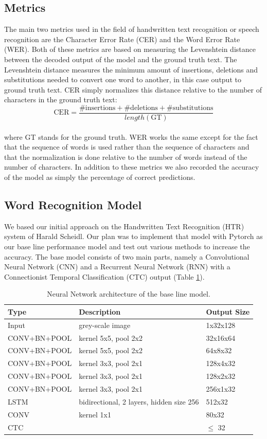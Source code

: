 \documentclass{article}
\begin{document}
\subsection{Metrics}
The main two metrics used in the field of handwritten text recognition or speech recognition are the Character Error Rate (CER) and the Word Error Rate (WER). Both of these metrics are based on measuring the Levenshtein distance between the decoded output of the model and the ground truth text. The Levenshtein distance measures the minimum amount of insertions, deletions and substitutions needed to convert one word to another, in this case output to ground truth text. CER simply normalizes this distance relative to the number of characters in the ground truth text:\\
\[
\text{CER} = \frac{\text{\#insertions}+\text{\#deletions}+\text{\#substitutions}}{length(\text{GT})}
\]\\ 
where GT stands for the ground truth. WER works the same except for the fact that the sequence of words is used rather than the sequence of characters and that the normalization is done relative to the number of words instead of the number of characters. In addition to these metrics we also recorded the accuracy of the model as simply the percentage of correct predictions.
\subsection{Word Recognition Model}
We based our initial approach on the Handwritten Text Recognition (HTR) system of Harald Scheidl\cite{ScheidlHTR}\cite{ScheidlCTC}. Our plan was to implement that model with Pytorch as our base line performance model and test out various methods to increase the accuracy. The base model consists of two main parts, namely a Convolutional Neural Network (CNN) and a Recurrent Neural Network (RNN) with a Connectionist Temporal Classification (CTC) output (Table \ref{tab:SmallModel}).
\begin{table}[H]
\centering
\begin{tabular}{l|l|l}
Type & Description & Output Size \\ \hline
Input & grey-scale image & 1x32x128 \\ \hline
CONV+BN+POOL & kernel 5x5, pool 2x2 & 32x16x64 \\ \hline
CONV+BN+POOL & kernel 5x5, pool 2x2 & 64x8x32 \\ \hline
CONV+BN+POOL & kernel 3x3, pool 2x1 & 128x4x32 \\ \hline
CONV+BN+POOL & kernel 3x3, pool 2x1 & 128x2x32 \\ \hline
CONV+BN+POOL & kernel 3x3, pool 2x1 & 256x1x32 \\ \hline
LSTM         & bidirectional, 2 layers, hidden size 256 & 512x32 \\ \hline
CONV         & kernel 1x1 & 80x32 \\ \hline
CTC          &      & \(\leqslant\) 32 \\ \hline
\end{tabular}
\caption{Neural Network architecture of the base line model.}
\label{tab:SmallModel}
\end{table}
\end{document}
